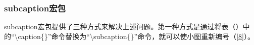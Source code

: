 \documentclass{article}
\begin{document}


\subsubsection{subcaption宏包}
    subcaption宏包提供了三种方式来解决上述问题。第一种方式是通过将表（\label{6}）中的``\textbackslash caption\{\}''命令替换为``\textbackslash subcaption\{\}''命令，就可以使小图重新编号（\ref{8}）。
\end{document}
